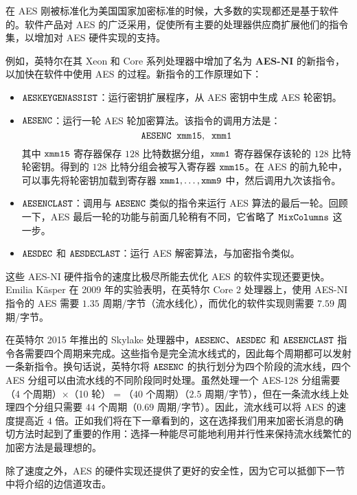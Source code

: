 \begin{snote}[AES的硬件实现。]
在 AES 刚被标准化为美国国家加密标准的时候，大多数的实现都还是基于软件的。软件产品对 AES 的广泛采用，促使所有主要的处理器供应商扩展他们的指令集，以增加对 AES 硬件实现的支持。

例如，英特尔在其 Xeon 和 Core 系列处理器中增加了名为 \textbf{AES-NI} 的新指令，以加快在软件中使用 AES 的过程。新指令的工作原理如下：
\begin{itemize}
	\item $\tt{AESKEYGENASSIST}$：运行密钥扩展程序，从 AES 密钥中生成 AES 轮密钥。
	\item $\tt{AESENC}$：运行一轮 AES 轮加密算法。该指令的调用方法是：
	\[
    \tt{AESENC\;\;xmm15,\;\;xmm1}
    \]
    其中 $\tt xmm15$ 寄存器保存 $128$ 比特数据分组，$\tt xmm1$ 寄存器保存该轮的 $128$ 比特轮密钥。得到的 $128$ 比特分组会被写入寄存器 $\tt xmm15$。在 AES 的前九轮中，可以事先将轮密钥加载到寄存器 $\tt{xmm1,\dots,xmm9}$ 中，然后调用九次该指令。
    \item $\tt AESENCLAST$：调用与 $\tt AESENC$ 类似的指令来运行 AES 算法的最后一轮。回顾一下，AES 最后一轮的功能与前面几轮稍有不同，它省略了 $\tt MixColumns$ 这一步。
    \item $\tt AESDEC$ 和 $\tt AESDECLAST$：运行 AES 解密算法，与加密指令类似。
\end{itemize}
这些 AES-NI 硬件指令的速度比极尽所能去优化 AES 的软件实现还要更快。Emilia Käsper 在 2009 年的实验表明，在英特尔 Core 2 处理器上，使用 AES-NI 指令的 AES 需要 $1.35$ 周期/字节（流水线化），而优化的软件实现则需要 $7.59$ 周期/字节。

在英特尔 2015 年推出的 Skylake 处理器中，$\tt AESENC$、$\tt AESDEC$ 和 $\tt AESENCLAST$ 指令各需要四个周期来完成。这些指令是完全流水线式的，因此每个周期都可以发射一条新指令。换句话说，英特尔将 $\tt AESENC$ 的执行划分为四个阶段的流水线，四个 AES 分组可以由流水线的不同阶段同时处理。虽然处理一个 AES-128 分组需要（4 个周期）$\times$（10 轮）$=$（$40$ 个周期）（$2.5$ 周期/字节），但在一条流水线上处理四个分组只需要 $44$ 个周期（$0.69$ 周期/字节）。因此，流水线可以将 AES 的速度提高近 $4$ 倍。正如我们将在下一章看到的，这在选择我们用来加密长消息的确切方法时起到了重要的作用：选择一种能尽可能地利用并行性来保持流水线繁忙的加密方法是最理想的。

除了速度之外，AES 的硬件实现还提供了更好的安全性，因为它可以抵御下一节中将介绍的边信道攻击。
\end{snote}